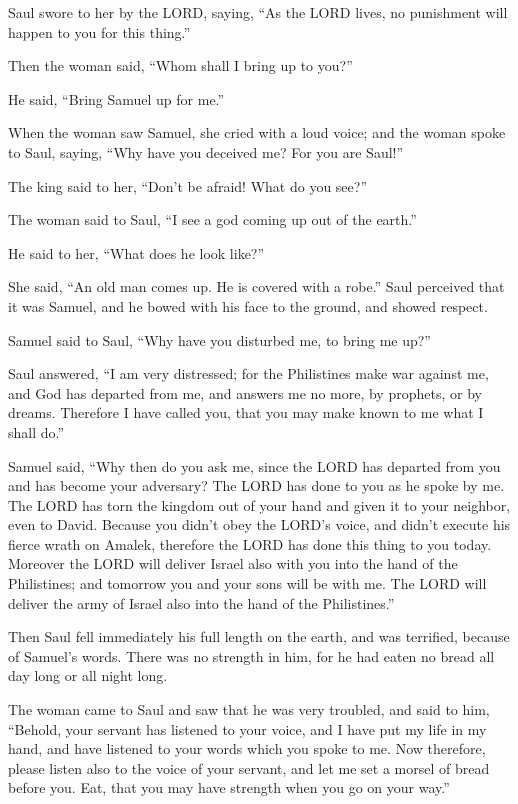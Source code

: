 \myverse{}Saul swore to her by the LORD, saying, “As the LORD lives, no
punishment will happen to you for this thing.”

\myverse{}Then the woman said, “Whom shall I bring up to you?”

He said, “Bring Samuel up for me.”

\myverse{}When the woman saw Samuel, she cried with a loud voice; and
the woman spoke to Saul, saying, “Why have you deceived me? For you are Saul!”

\myverse{}The king said to her, “Don’t be afraid! What do you see?”

The woman said to Saul, “I see a god coming up out of the earth.”

\myverse{}He said to her, “What does he look like?”

She said, “An old man comes up. He is covered with a robe.” Saul perceived that it was Samuel,
and he bowed with his face to the ground, and showed respect.

\myverse{}Samuel said to Saul, “Why have you disturbed me, to bring me
up?”

Saul answered, “I am very distressed; for the Philistines make war against me, and God has
departed from me, and answers me no more, by prophets, or by dreams. Therefore I have called you, that
you may make known to me what I shall do.”

\myverse{}Samuel said, “Why then do you ask me, since the LORD has departed
from you and has become your adversary?
\myverse{}The LORD has done to you as he spoke by me. The LORD has torn the kingdom
out of your hand and given it to your neighbor, even to David.
\myverse{}Because you didn’t obey the LORD’s voice, and didn’t execute his fierce wrath
on Amalek, therefore the LORD has done this thing to you today.
\myverse{}Moreover the LORD will deliver Israel also with you into the hand of the
Philistines; and tomorrow you and your sons will be with me. The LORD will deliver the army of Israel
also into the hand of the Philistines.”

\myverse{}Then Saul fell immediately his full length on the earth, and
was terrified, because of Samuel’s words. There was no strength in him, for he had eaten no bread all
day long or all night long.

\myverse{}The woman came to Saul and saw that he was very troubled, and
said to him, “Behold, your servant has listened to your voice, and I have put my life in my hand, and
have listened to your words which you spoke to me.
\myverse{}Now therefore, please listen also to the voice of your servant, and let me
set a morsel of bread before you. Eat, that you may have strength when you go on your way.”

